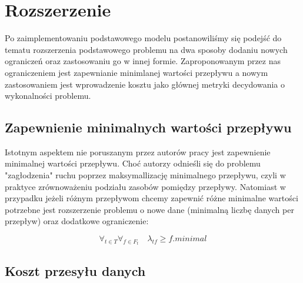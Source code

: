 \section{Rozszerzenie}

Po zaimplementowaniu podstawowego modelu postanowiliśmy się podejść do tematu
rozszerzenia podstawowego problemu na dwa sposoby dodaniu nowych ograniczeń
oraz zastosowaniu go w innej formie. Zaproponowanym przez nas ograniczeniem jest
zapewnianie minimlanej wartości przepływu a nowym zastosowaniem jest wprowadzenie
kosztu jako głównej metryki decydowania o wykonalności problemu.

\subsection{Zapewnienie minimalnych wartości przepływu}

Istotnym aspektem nie poruszanym przez autorów pracy jest zapewnienie
minimalnej wartości przepływu. Choć autorzy odnieśli się do problemu "zagłodzenia"
ruchu poprzez maksymallizację minimalnego przepływu, czyli w praktyce zrównoważeniu
podziału zasobów pomiędzy przepływy. Natomiast w przypadku jeżeli różnym przepływom
chcemy zapewnić różne minimalne wartości potrzebne jest rozszerzenie problemu o
nowe dane (minimalną liczbę danych per przepływ) oraz dodatkowe ograniczenie:

\begin{equation}
  \forall_{t \in T} \forall_{f \in F_t} \quad \lambda_{tf} \ge f.minimal
\end{equation}

\subsection{Koszt przesyłu danych}
